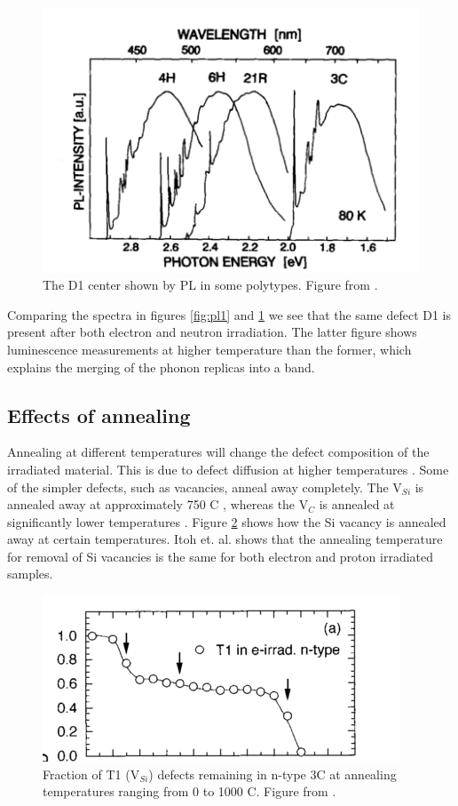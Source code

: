 \documentclass[a4paper,12pt]{article}
\begin{document}
\begin{figure}[H]
\begin{center}
\includegraphics[scale=0.7]{D1.png}
\caption{The D1 center shown by PL in some polytypes. Figure from \cite{SchneiderJ.andMaierK.1993}.
\label{fig:D1}}
\end{center}
\end{figure}

Comparing the spectra in figures \ref{fig:pl1} and \ref{fig:D1} we see that the same defect D1 is present after both electron and neutron irradiation. The latter figure shows luminescence measurements at higher temperature than the former, which explains the merging of the phonon replicas into a band. 

\subsection*{Effects of annealing}
Annealing at different temperatures will change the defect composition of the irradiated material. This is due to defect diffusion at higher temperatures \cite{Itoh1997}. Some of the simpler defects, such as vacancies, anneal away completely. The V$_{Si}$ is annealed away at approximately 750 C \cite{Itoh1997}, whereas the V$_C$  is annealed at significantly lower temperatures \cite{Kalinina2007}. Figure \ref{fig:annealing2} shows how the Si vacancy is annealed away at certain temperatures. Itoh et. al. shows that the annealing temperature for removal of Si vacancies is the same for both electron and proton irradiated samples. 

\begin{figure}[H]
\begin{center}
\includegraphics[scale=0.7]{annealing2.png}
\caption{Fraction of T1 (V$_{Si}$) defects remaining in n-type 3C at annealing temperatures ranging from 0 to 1000 C. Figure from \cite{Itoh1997}.
\label{fig:annealing2}}
\end{center}
\end{figure}
\end{document}
